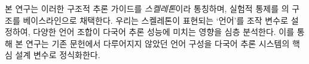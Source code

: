 본 연구는 이러한 구조적 추론 가이드를 \emph{스켈레톤}이라 통칭하며, 실험적 통제를 \citet{qi2025sot}의 구조를 베이스라인으로 채택한다. 우리는 스켈레톤이 표현되는 `언어'를 조작 변수로 설정하여, 다양한 언어 조합이 다국어 추론 성능에 미치는 영향을 심층 분석한다. 이를 통해 본 연구는 기존 문헌에서 다루어지지 않았던 언어 구성을 다국어 추론 시스템의 핵심 설계 변수로 정식화한다.








